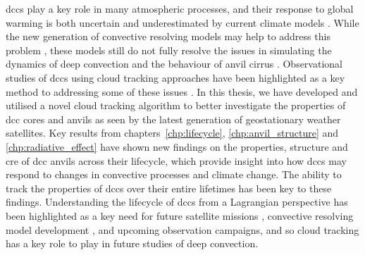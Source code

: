 
\acrshort{dcc}s play a key role in many atmospheric processes, and their response to global warming is both uncertain \citep{sherwood_assessment_2020} and underestimated by current climate models \citep{hill_climate_2023}.
While the new generation of convective resolving models may help to address this problem \citep{stevens_added_2020}, these models still do not fully resolve the issues in simulating the dynamics of deep convection \citep{jeevanjee_vertical_2017} and the behaviour of anvil cirrus \citep{sullivan_ice_2021}.
Observational studies of \acrshort{dcc}s using cloud tracking approaches have been highlighted as a key method to addressing some of these issues \citep{gasparini_opinion_2023}.
In this thesis, we have developed and utilised a novel cloud tracking algorithm to better investigate the properties of \acrshort{dcc} cores and anvils as seen by the latest generation of geostationary weather satellites.
Key results from chapters~\ref{chp:lifecycle}, \ref{chp:anvil_structure} and \ref{chp:radiative_effect} have shown new findings on the properties, structure and \acrshort{cre} of \acrshort{dcc} anvils across their lifecycle, which provide insight into how \acrshort{dcc}s may respond to changes in convective processes and climate change.
The ability to track the properties of \acrshort{dcc}s over their entire lifetimes has been key to these findings.
Understanding the lifecycle of \acrshort{dcc}s from a Lagrangian perspective has been highlighted as a key need for future satellite missions \citep{vandenheever_tropical_2023}, convective resolving model development \citep{prein_kmscale_2024}, and upcoming observation campaigns, and so cloud tracking has a key role to play in future studies of deep convection.
